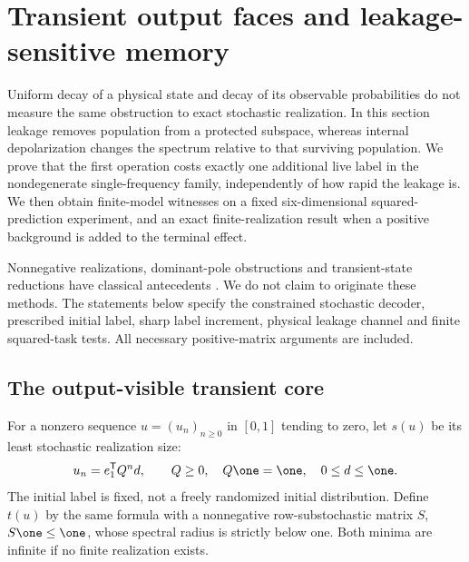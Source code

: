 \section{Transient output faces and leakage-sensitive memory}\label{sec:r70-leakage}
Uniform decay of a physical state and decay of its observable probabilities do not measure the same obstruction to exact stochastic realization. In this section leakage removes population from a protected subspace, whereas internal depolarization changes the spectrum relative to that surviving population. We prove that the first operation costs exactly one additional live label in the nondegenerate single-frequency family, independently of how rapid the leakage is. We then obtain finite-model witnesses on a fixed six-dimensional squared-prediction experiment, and an exact finite-realization result when a positive background is added to the terminal effect.

Nonnegative realizations, dominant-pole obstructions and transient-state reductions have classical antecedents \cite{BenvenutiFarina04,OCinneide90,Maier91,MonrasWinter14}. We do not claim to originate these methods. The statements below specify the constrained stochastic decoder, prescribed initial label, sharp label increment, physical leakage channel and finite squared-task tests. All necessary positive-matrix arguments are included.

\subsection{The output-visible transient core}
For a nonzero sequence $u=(u_n)_{n\ge0}$ in $[0,1]$ tending to zero, let $s(u)$ be its least stochastic realization size:
\[
 u_n=e_1^{\mathsf T}Q^nd,\qquad Q\ge0,\quad Q\one=\one,\quad 0\le d\le\one.
\]
The initial label is fixed, not a freely randomized initial distribution. Define $t(u)$ by the same formula with a nonnegative row-substochastic matrix $S$, $S\one\le\one$, whose spectral radius is strictly below one. Both minima are infinite if no finite realization exists.

